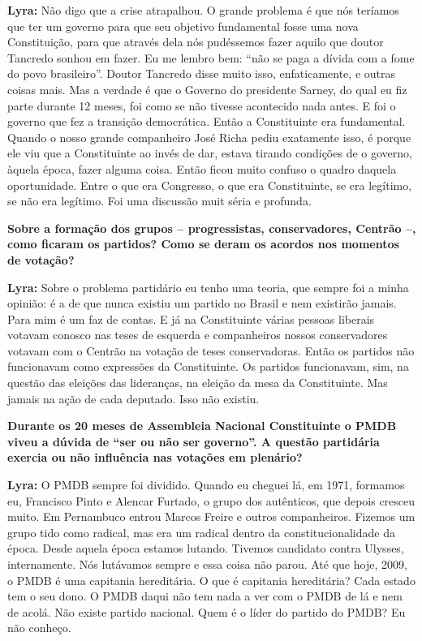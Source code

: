 \textbf{Lyra:} Não digo que a crise atrapalhou. O grande problema é que
nós teríamos que ter um governo para que seu objetivo fundamental fosse
uma nova Constituição, para que através dela nós pudéssemos fazer aquilo
que doutor Tancredo sonhou em fazer. Eu me lembro bem: ``não se paga a
dívida com a fome do povo brasileiro''. Doutor Tancredo disse muito
isso, enfaticamente, e outras coisas mais. Mas a verdade é que o Governo
do presidente Sarney, do qual eu fiz parte durante 12 meses, foi como se
não tivesse acontecido nada antes. E foi o governo que fez a transição
democrática. Então a Constituinte era fundamental. Quando o nosso grande
companheiro José Richa pediu exatamente isso, é porque ele viu que a
Constituinte ao invés de dar, estava tirando condições de o governo,
àquela época, fazer alguma coisa. Então ficou muito confuso o quadro
daquela oportunidade. Entre o que era Congresso, o que era Constituinte,
se era legítimo, se não era legítimo. Foi uma discussão muit séria e
profunda.

\textbf{Sobre a formação dos grupos -- progressistas, conservadores,
Centrão --, como ficaram os partidos? Como se deram os acordos nos
momentos de votação?}

\textbf{Lyra:} Sobre o problema partidário eu tenho uma teoria, que
sempre foi a minha opinião: é a de que nunca existiu um partido no
Brasil e nem existirão jamais. Para mim é um faz de contas. E já na
Constituinte várias pessoas liberais votavam conosco nas teses de
esquerda e companheiros nossos conservadores votavam com o Centrão na
votação de teses conservadoras. Então os partidos não funcionavam como
expressões da Constituinte. Os partidos funcionavam, sim, na questão das
eleições das lideranças, na eleição da mesa da Constituinte. Mas jamais
na ação de cada deputado. Isso não existiu.

\textbf{Durante os 20 meses de Assembleia Nacional Constituinte o PMDB
viveu a dúvida de ``ser ou não ser governo''. A questão partidária
exercia ou não influência nas votações em plenário?}

\textbf{Lyra:} O PMDB sempre foi dividido. Quando eu cheguei lá, em
1971, formamos eu, Francisco Pinto e Alencar Furtado, o grupo dos
autênticos, que depois cresceu muito. Em Pernambuco entrou Marcos Freire
e outros companheiros. Fizemos um grupo tido como radical, mas era um
radical dentro da constitucionalidade da época. Desde aquela época
estamos lutando. Tivemos candidato contra Ulysses, internamente. Nós
lutávamos sempre e essa coisa não parou. Até que hoje, 2009, o PMDB é
uma capitania hereditária. O que é capitania hereditária? Cada estado
tem o seu dono. O PMDB daqui não tem nada a ver com o PMDB de lá e nem
de acolá. Não existe partido nacional. Quem é o líder do partido do
PMDB? Eu não conheço.

